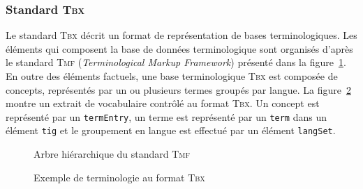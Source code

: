       \subsubsection{Standard \textsc{Tbx}}
      \label{subsubsec:main-automatic_evaluation_of_keyphrase_annotation-methodology-data_format-tbx}
        Le standard \textsc{Tbx} décrit un format de représentation de bases
        terminologiques. Les éléments qui composent la base de données
        terminologique sont organisés d'après le standard \textsc{Tmf}
        (\textit{Terminological Markup Framework}) présenté dans la
        figure~\ref{fig:tmf}. En outre des éléments factuels, une base
        terminologique \textsc{Tbx} est composée de concepts, représentés par un
        ou plusieurs termes groupés par langue. La figure~\ref{fig:tbx_example}
        montre un extrait de vocabulaire contrôlé au format \textsc{Tbx}. Un
        concept est représenté par un \texttt{termEntry}, un terme est
        représenté par un \texttt{term} dans un élément \texttt{tig} et le
        groupement en langue est effectué par un élément \texttt{langSet}.
        \begin{figure}
          \centering
          \caption{Arbre hiérarchique du standard \textsc{Tmf}
                   \label{fig:tmf}}
        \end{figure}
        \begin{figure}[h!]
          \setlstxml
          
          \caption{Exemple de terminologie au format \textsc{Tbx}
                   \label{fig:tbx_example}}
        \end{figure}

